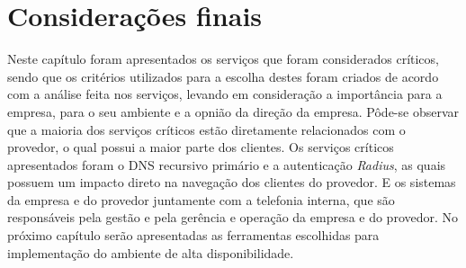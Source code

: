 \section{Considerações finais}

Neste capítulo foram apresentados os serviços que foram considerados críticos, sendo que os critérios utilizados para a escolha destes foram 
criados de acordo com a análise feita nos serviços, levando em consideração a importância para a empresa, para o seu ambiente e a opnião da 
direção da empresa. Pôde-se observar que a maioria dos serviços críticos estão diretamente relacionados com o provedor, o qual possui a maior
parte dos clientes. Os serviços críticos apresentados foram o \ac{DNS} recursivo primário e a autenticação \textit{Radius}, as quais possuem
um impacto direto na navegação dos clientes do provedor. E os sistemas da empresa e do provedor juntamente com a telefonia interna, que 
são responsáveis pela gestão e pela gerência e operação da empresa e do provedor.
No próximo capítulo serão apresentadas as ferramentas escolhidas para implementação do ambiente de alta disponibilidade. 
